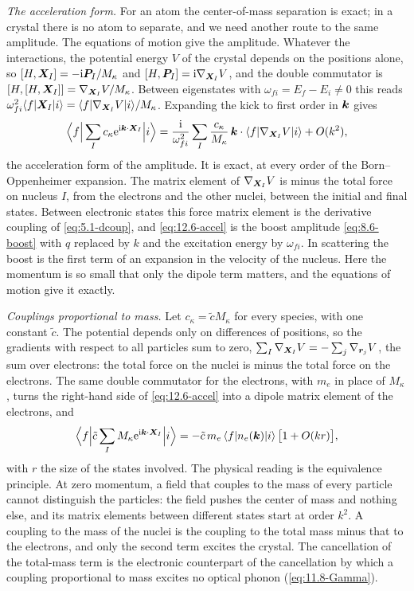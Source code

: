 \emph{The acceleration form.} For an atom the center-of-mass separation is exact; in a crystal there is no atom to separate, and we need another route to the same amplitude. The equations of motion give the amplitude. Whatever the interactions, the potential energy $V$ of the crystal depends on the positions alone, so $[H,\bm{X}_I] = -\mathrm{i}\bm{P}_I/M_\kappa$ and $[H,\bm{P}_I] = \mathrm{i}\nabla_{\bm{X}_I}V$, and the double commutator is $[H,[H,\bm{X}_I]] = \nabla_{\bm{X}_I}V/M_\kappa$. Between eigenstates with $\omega_{fi} = E_f - E_i \neq 0$ this reads $\omega_{fi}^2\langle f|\bm{X}_I|i\rangle = \langle f|\nabla_{\bm{X}_I}V|i\rangle/M_\kappa$. Expanding the kick to first order in $\bm{k}$ gives
\begin{equation}
  \Bigl\langle f\Big|\sum_Ic_\kappa\mathrm{e}^{\mathrm{i}\bm{k}\cdot\bm{X}_I}\Big|i\Bigr\rangle = \frac{\mathrm{i}}{\omega_{fi}^2}\sum_I\frac{c_\kappa}{M_\kappa}\,\bm{k}\cdot\langle f|\nabla_{\bm{X}_I}V|i\rangle + O(k^2) ,
  \label{eq:12.6-accel}
\end{equation}
the acceleration form of the amplitude. It is exact, at every order of the Born--Oppenheimer expansion. The matrix element of $\nabla_{\bm{X}_I}V$ is minus the total force on nucleus $I$, from the electrons and the other nuclei, between the initial and final states. Between electronic states this force matrix element is the derivative coupling of \cref{eq:5.1-dcoup}, and \cref{eq:12.6-accel} is the boost amplitude \cref{eq:8.6-boost} with $q$ replaced by $k$ and the excitation energy by $\omega_{fi}$. In scattering the boost is the first term of an expansion in the velocity of the nucleus. Here the momentum is so small that only the dipole term matters, and the equations of motion give it exactly.

\emph{Couplings proportional to mass.} Let $c_\kappa = \tilde cM_\kappa$ for every species, with one constant $\tilde c$. The potential depends only on differences of positions, so the gradients with respect to all particles sum to zero, $\sum_I\nabla_{\bm{X}_I}V = -\sum_j\nabla_{\bm{r}_j}V$, the sum over electrons: the total force on the nuclei is minus the total force on the electrons. The same double commutator for the electrons, with $m_e$ in place of $M_\kappa$, turns the right-hand side of \cref{eq:12.6-accel} into a dipole matrix element of the electrons, and
\begin{equation}
  \Bigl\langle f\Big|\tilde c\sum_IM_\kappa\mathrm{e}^{\mathrm{i}\bm{k}\cdot\bm{X}_I}\Big|i\Bigr\rangle = -\tilde c\,m_e\,\langle f|n_e(\bm{k})|i\rangle\,\bigl[1 + O(kr)\bigr] ,
  \label{eq:12.6-mass}
\end{equation}
with $r$ the size of the states involved. The physical reading is the equivalence principle. At zero momentum, a field that couples to the mass of every particle cannot distinguish the particles: the field pushes the center of mass and nothing else, and its matrix elements between different states start at order $k^2$. A coupling to the mass of the nuclei is the coupling to the total mass minus that to the electrons, and only the second term excites the crystal. The cancellation of the total-mass term is the electronic counterpart of the cancellation by which a coupling proportional to mass excites no optical phonon (\cref{eq:11.8-Gamma}).

